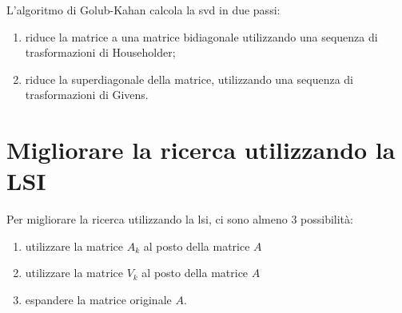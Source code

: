 L'algoritmo di Golub-Kahan calcola la \gls{svd} in due passi:
\begin{enumerate}
    \item riduce la matrice a una matrice bidiagonale utilizzando una sequenza di trasformazioni di Householder;
    \item riduce la superdiagonale della matrice, utilizzando una sequenza di trasformazioni di Givens.
\end{enumerate} 

\section{Migliorare la ricerca utilizzando la LSI}
Per migliorare la ricerca utilizzando la \gls{lsi}, ci sono almeno 3 possibilità:
\begin{enumerate}
    \item utilizzare la matrice $A_k$ al posto della matrice $A$
    \item utilizzare la matrice $V_k$ al posto della matrice $A$
    \item espandere la matrice originale $A$.
\end{enumerate}